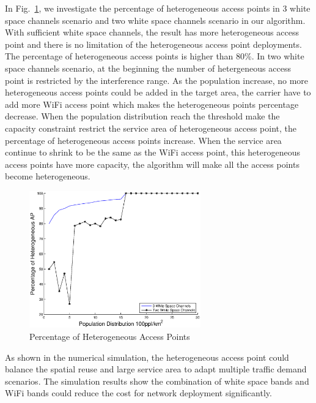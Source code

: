 In Fig.~\ref{fig:heappercentage}, we investigate the percentage of heterogeneous access points
in 3 white space channels scenario and two white space channels scenario in our algorithm. 
With sufficient white space channels, the result has more heterogeneous access point and there is no 
limitation of the heterogeneous access point deployments. The percentage of heterogeneous access points
is higher than 80\%. In two white space channels scenario, at the beginning the number of hetergeneous
access point is restricted by the interference range. As the population increase, no more heterogeneous
access points could be added in the target area, the carrier have to add more WiFi access point which 
makes the heterogeneous points percentage decrease. When the population distribution reach the threshold 
make the capacity constraint restrict the service area of heterogeneous access point, the percentage of 
heterogeneous access points increase. When the service area continue to shrink to be the same as the WiFi 
access point, this heterogeneous access points have more capacity, the algorithm will make all the access 
points become heterogeneous. 



\begin{figure}
\centering
\includegraphics[width=74mm]{figures/percentage}
\vspace{-0.1in}
\caption{Percentage of Heterogeneous Access Points}                                                                 
\label{fig:heappercentage}
\vspace{-0.1in}
\end{figure}

As shown in the numerical simulation, the heterogeneous access point could balance
the spatial reuse and large service area to adapt multiple traffic demand scenarios.
The simulation results show the combination of white space bands and WiFi bands could 
reduce the cost for network deployment significantly.






